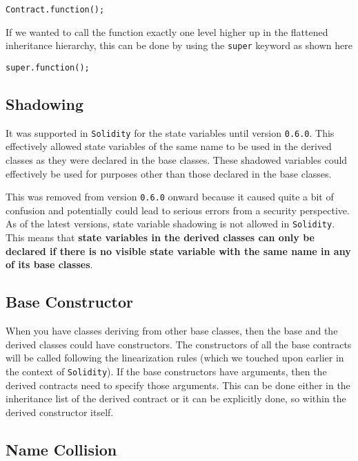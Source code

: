\begin{lstlisting}[language=Solidity,numbers=none]
Contract.function();
\end{lstlisting}

If we wanted to call the function exactly one level higher up in the
flattened inheritance hierarchy, this can be done by using the
\texttt{super} keyword as shown here

\begin{lstlisting}[language=Solidity,numbers=none]
super.function();
\end{lstlisting}

\subsection{Shadowing}\label{shadowing}

It was supported in \texttt{Solidity} for the state variables until
version \texttt{0.6.0}. This effectively allowed state variables of the
same name to be used in the derived classes as they were declared in the
base classes. These shadowed variables could effectively be used for
purposes other than those declared in the base classes.

This was removed from version \texttt{0.6.0} onward because it caused
quite a bit of confusion and potentially could lead to serious errors
from a security perspective. As of the latest versions, state variable
shadowing is not allowed in \texttt{Solidity}. This means that
\textbf{state variables in the derived classes can only be declared if
there is no visible state variable with the same name in any of its base
classes}.

\subsection{Base Constructor}\label{base-constructor}

When you have classes deriving from other base classes, then the base
and the derived classes could have constructors. The constructors of all
the base contracts will be called following the linearization rules
(which we touched upon earlier in the context of \texttt{Solidity}). If
the base constructors have arguments, then the derived contracts need to
specify those arguments. This can be done either in the inheritance list
of the derived contract or it can be explicitly done, so within the
derived constructor itself.

\subsection{Name Collision}\label{name-collision}


